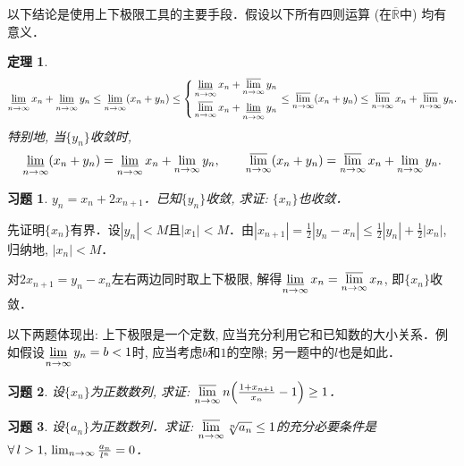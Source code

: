 \documentclass[11pt,a4paper]{ctexart}
\makeatletter
\theoremstyle{thmseries} %
\newtheorem{thm}{定理}[section]
\theoremstyle{exerseries}
\newtheorem{exer}{习题}[section]
\renewenvironment{proof}[1][\proofname]{\par
  \pushQED{\qed}%
  \normalfont \topsep6\p@\@plus6\p@\relax
  \trivlist
  \item[\hskip\labelsep
        \itshape
    #1\@addpunct{}]\ignorespaces
}{%
  \popQED\endtrivlist\@endpefalse
}
\newenvironment{pf}{\begin{proof}[\bfseries\upshape 证\quad]}{\end{proof}}
\newcommand{\bra}[1]{\mathopen{}\left(#1\right)}
\newcommand{\cbra}[1]{\mathopen{}\left\{#1\right\}}
\renewcommand{\epsilon}{\varepsilon}
\newcommand{\R}{\mathbb{R}}
\newcommand{\N}{\mathbb{N}}
\def \nti {\mathnormal{n}\to\infty}
\DeclareMathOperator{\llim}{\underset{\nti}{\underline{\lim}}}
\DeclareMathOperator{\ulim}{\underset{\nti}{\overline{\lim}}}
\makeatother
\begin{document}
以下结论是使用上下极限工具的主要手段．假设以下所有四则运算 (在$\overline{\R}$中) 均有意义．
\begin{thm}
	\[\llim x_n+\llim y_n\leq\llim\bra{x_n+y_n}\leq
	\left\{\begin{aligned}
	&\llim x_n+\ulim y_n\\
	&\ulim x_n+\llim y_n\\
	\end{aligned}\right.
	\leq\ulim\bra{x_n+y_n}\leq\ulim x_n+\ulim y_n.\]
	特别地, 当$\{y_n\}$收敛时, 
	\[\llim\bra{x_n+y_n}=\llim x_n+\lim_{\nti} y_n,\qquad\ulim\bra{x_n+y_n}=\ulim x_n+\lim_{\nti} y_n.\]
\end{thm}

\begin{exer}
	$y_n=x_n+2x_{n+1}$．已知$\{y_n\}$收敛, 求证: $\{x_n\}$也收敛．
\end{exer}
\begin{pf}
	先证明$\{x_n\}$有界．设$|y_n|<M$且$|x_1|<M$．由$|x_{n+1}|=\frac{1}{2}|y_n-x_n|\leq\frac{1}{2}|y_n|+\frac{1}{2}|x_n|$, 归纳地, $|x_n|<M$．

	对$2x_{n+1}=y_n-x_n$左右两边同时取上下极限, 解得$\llim x_n=\ulim x_n$, 即$\{x_n\}$收敛．
\end{pf}


以下两题体现出: 上下极限是一个定数, 应当充分利用它和已知数的大小关系．例如假设$\llim y_n=b<1$时, 应当考虑$b$和$1$的空隙; 另一题中的$l$也是如此．
\begin{exer}
	设$\{x_n\}$为正数数列, 求证: $\ulim n\bra{\frac{1+x_{n+1}}{x_n}-1}\geq1$．
\end{exer}

\begin{exer}
	设$\{a_n\}$为正数数列．求证: $\ulim \sqrt[n]{a_n}\leq1$的充分必要条件是$\forall\,l>1,\,\lim_{\nti}\frac{a_n}{l^n}=0$．
\end{exer}
\end{document}
